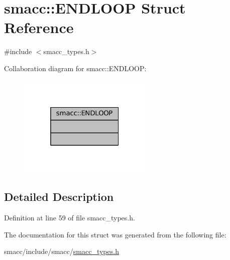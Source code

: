 \hypertarget{structsmacc_1_1ENDLOOP}{}\section{smacc\+:\+:E\+N\+D\+L\+O\+OP Struct Reference}
\label{structsmacc_1_1ENDLOOP}


{\ttfamily \#include $<$smacc\+\_\+types.\+h$>$}



Collaboration diagram for smacc\+:\+:E\+N\+D\+L\+O\+OP\+:
\nopagebreak
\begin{figure}[H]
\begin{center}
\leavevmode
\includegraphics[width=181pt]{structsmacc_1_1ENDLOOP__coll__graph}
\end{center}
\end{figure}


\subsection{Detailed Description}


Definition at line 59 of file smacc\+\_\+types.\+h.



The documentation for this struct was generated from the following file\+:\begin{DoxyCompactItemize}
\item 
smacc/include/smacc/\hyperlink{smacc__types_8h}{smacc\+\_\+types.\+h}\end{DoxyCompactItemize}
